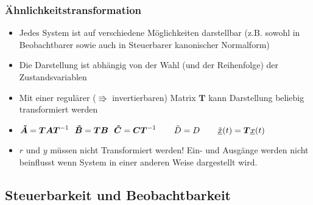 \subsubsection{Ähnlichkeitstransformation}
\begin{itemize}
	\item Jedes System ist auf verschiedene Möglichkeiten darstellbar (z.B. sowohl in Beobachtbarer sowie auch in Steuerbarer kanonischer Normalform)
	\item Die Darstellung ist abhängig von der Wahl (und der Reihenfolge) der Zustandsvariablen
	\item Mit einer regulärer ($\Rrightarrow$ invertierbaren) Matrix $\boldsymbol{T}$ kann Darstellung beliebig transformiert werden
	\item[ ] $	\boldsymbol{\tilde{A}} = \boldsymbol{TAT}^{-1} ~~ 
				\boldsymbol{\tilde{B}} = \boldsymbol{TB}~~
				\boldsymbol{\tilde{C}} = \boldsymbol{CT}^{-1} \hspace{5 mm} ~~
				\tilde{D} = D \hspace{5mm}~~
				\underline{\tilde{x}} (t) = \boldsymbol{T}\underline{x}(t)$
	\item $r$ und $y$ müssen nicht Transformiert werden! Ein- und Ausgänge werden nicht beinflusst wenn System in einer anderen Weise dargestellt wird. 
\end{itemize}

\subsection{Steuerbarkeit und Beobachtbarkeit}
